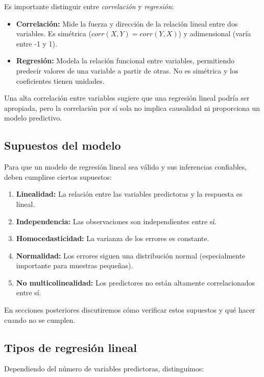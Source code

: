 Es importante distinguir entre \emph{correlación} y \emph{regresión}:

\begin{itemize}
	\item \textbf{Correlación:} Mide la fuerza y dirección de la relación lineal entre dos variables. Es simétrica ($corr(X,Y) = corr(Y,X)$) y adimensional (varía entre -1 y 1).
	
	\item \textbf{Regresión:} Modela la relación funcional entre variables, permitiendo predecir valores de una variable a partir de otras. No es simétrica y los coeficientes tienen unidades.
\end{itemize}

Una alta correlación entre variables sugiere que una regresión lineal podría ser apropiada, pero la correlación por sí sola no implica causalidad ni proporciona un modelo predictivo.

\subsection{Supuestos del modelo}

Para que un modelo de regresión lineal sea válido y sus inferencias confiables, deben cumplirse ciertos supuestos:

\begin{enumerate}
	\item \textbf{Linealidad:} La relación entre las variables predictoras y la respuesta es lineal.
	\item \textbf{Independencia:} Las observaciones son independientes entre sí.
	\item \textbf{Homocedasticidad:} La varianza de los errores es constante.
	\item \textbf{Normalidad:} Los errores siguen una distribución normal (especialmente importante para muestras pequeñas).
	\item \textbf{No multicolinealidad:} Los predictores no están altamente correlacionados entre sí.
\end{enumerate}

En secciones posteriores discutiremos cómo verificar estos supuestos y qué hacer cuando no se cumplen.

\subsection{Tipos de regresión lineal}

Dependiendo del número de variables predictoras, distinguimos:

